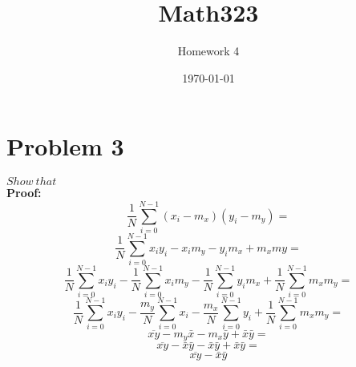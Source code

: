 \documentclass{article} %
\title{Math323} %
\author{Homework 4} %
\date{\today} %
\begin{document}
    \maketitle %
    
    \section*{Problem 3} %
    \mbox{$Show\: that\: $}\vspace{0.5in}\\
    \textbf{Proof:}
    \begin{equation} %
      \frac{1}{N}\sum_{i=0}^{N-1} (x_i-m_x)(y_i-m_y) =
    \end{equation}
    \begin{equation}
      \frac{1}{N}\sum_{i=0}^{N-1} x_iy_i-x_im_y-y_im_x+m_xmy =
    \end{equation}
    \begin{equation}
      \frac{1}{N}\sum_{i=0}^{N-1} x_iy_i - \frac{1}{N}\sum_{i=0}^{N-1} x_im_y - \frac{1}{N}\sum_{i=0}^{N-1} y_im_x + \frac{1}{N}\sum_{i=0}^{N-1} m_xm_y =
    \end{equation}
    \begin{equation}
      \frac{1}{N}\sum_{i=0}^{N-1} x_iy_i - \frac{m_y}{N}\sum_{i=0}^{N-1} x_i - \frac{m_x}{N}\sum_{i=0}^{N-1} y_i + \frac{1}{N}\sum_{i=0}^{N-1} m_xm_y =
    \end{equation}
    \begin{equation}
      \overline{xy} - m_y\bar{x} - m_x\bar{y} + \bar{x}\bar{y} =
    \end{equation}
    \begin{equation}
      \overline{xy} - \bar{x}\bar{y} - \bar{x}\bar{y} + \bar{x}\bar{y} =
    \end{equation}
    \begin{equation}
      \overline{xy} - \bar{x}\bar{y}
    \end{equation}
\end{document}
